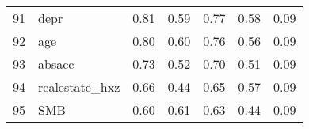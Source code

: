 \documentclass[12pt]{article}
\begin{document}
\begin{footnotesize}
\begin{longtable}{rl|c|c|c|c|c}
				91                   & depr                        & 0.81                             & 0.59                                                                                          & 0.77                                                                                          & 0.58                                                                                          & 0.09                                                                                                   \\
				92                   & age                         & 0.80                             & 0.60                                                                                          & 0.76                                                                                          & 0.56                                                                                          & 0.09                                                                                                   \\
				93                   & absacc                      & 0.73                             & 0.52                                                                                          & 0.70                                                                                          & 0.51                                                                                          & 0.09                                                                                                   \\
				94                   & realestate\_hxz             & 0.66                             & 0.44                                                                                          & 0.65                                                                                          & 0.57                                                                                          & 0.09                                                                                                   \\
				95                   & SMB                         & 0.60                             & 0.61                                                                                          & 0.63                                                                                          & 0.44                                                                                          & 0.09                                                                                                   \\

\end{longtable}
\end{footnotesize}
\end{document}
